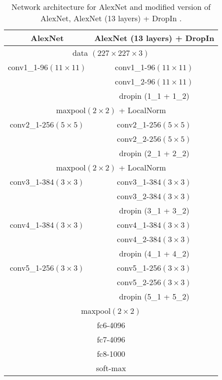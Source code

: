\documentclass[10pt,twocolumn,letterpaper]{article}
\newcommand{\dropin}{DropIn }
\begin{document}
\begin{table}[htb]
\begin{center}
  \begin{tabular}{| c | c |}
    \hline
     AlexNet  & AlexNet (13 layers) {\color{red}+ \dropin} \\ \hline
    
     \multicolumn{2}{|c|}{data $(227\times227\times3)$} \\ \hline
     conv1\_1-96$(11\times 11)$ & conv1\_1-96$(11\times 11)$ \\ 
      & conv1\_2-96$(11\times 11)$ \\ 
     &					{\color{red}dropin (1\_1 + 1\_2)} \\ \hline
	\multicolumn{2}{|c|}{maxpool$(2\times2)$ + LocalNorm} \\ \hline
     conv2\_1-256$(5\times 5)$ & conv2\_1-256$(5\times 5)$ \\ 
      & conv2\_2-256$(5\times 5)$ \\ 
     &					{\color{red}dropin (2\_1 + 2\_2)} \\ \hline
\multicolumn{2}{|c|}{maxpool$(2\times2)$ + LocalNorm} \\ \hline
     conv3\_1-384$(3\times 3)$ & conv3\_1-384$(3\times 3)$ \\ 
      & conv3\_2-384$(3\times 3)$ \\ 
     &					{\color{red}dropin (3\_1 + 3\_2)} \\ \hline
     conv4\_1-384$(3\times 3)$ & conv4\_1-384$(3\times 3)$ \\ 
      & conv4\_2-384$(3\times 3)$ \\
     &					{\color{red}dropin (4\_1 + 4\_2)} \\ \hline
     conv5\_1-256$(3\times 3)$ & conv5\_1-256$(3\times 3)$ \\ 
      & conv5\_2-256$(3\times 3)$ \\
     &					{\color{red}dropin (5\_1 + 5\_2)} \\ \hline
\multicolumn{2}{|c|}{maxpool$(2\times2)$} \\ \hline
\multicolumn{2}{|c|}{fc6-4096} \\ \hline
\multicolumn{2}{|c|}{fc7-4096} \\ \hline
\multicolumn{2}{|c|}{fc8-1000} \\ \hline
\multicolumn{2}{|c|}{soft-max} \\ \hline
  \end{tabular}
  \caption{Network architecture for AlexNet and modified version of AlexNet, AlexNet (13 layers) + \dropin.  }
  \label{tab:alexnet13}
\end{center}
  \vspace{-15pt}
\end{table}
\end{document}
